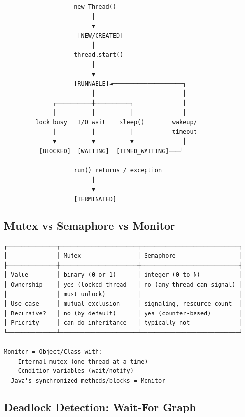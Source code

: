 \documentclass[11pt]{article}
\begin{document}
\begin{verbatim}
                    new Thread()
                         │
                         ▼
                     [NEW/CREATED]
                         │
                    thread.start()
                         │
                         ▼
                    [RUNNABLE]◄────────────────────┐
                         │                         │
              ┌──────────┼──────────┐              │
              │          │          │              │
         lock busy   I/O wait    sleep()        wakeup/
              │          │          │           timeout
              ▼          ▼          ▼              │
          [BLOCKED]  [WAITING]  [TIMED_WAITING]───┘
                                                   
                    run() returns / exception
                         │
                         ▼
                    [TERMINATED]
\end{verbatim}

\subsection{Mutex vs Semaphore vs Monitor}\label{mutex-vs-semaphore-vs-monitor}

\setcodelang{}

\begin{verbatim}
┌──────────────┬──────────────────────┬────────────────────────────┐
│              │ Mutex                │ Semaphore                  │
├──────────────┼──────────────────────┼────────────────────────────┤
│ Value        │ binary (0 or 1)      │ integer (0 to N)           │
│ Ownership    │ yes (locked thread   │ no (any thread can signal) │
│              │ must unlock)         │                            │
│ Use case     │ mutual exclusion     │ signaling, resource count  │
│ Recursive?   │ no (by default)      │ yes (counter-based)        │
│ Priority     │ can do inheritance   │ typically not              │
└──────────────┴──────────────────────┴────────────────────────────┘

Monitor = Object/Class with:
  - Internal mutex (one thread at a time)
  - Condition variables (wait/notify)
  Java's synchronized methods/blocks = Monitor
\end{verbatim}

\subsection{Deadlock Detection: Wait-For Graph}\label{deadlock-detection-wait-for-graph}
\end{document}
